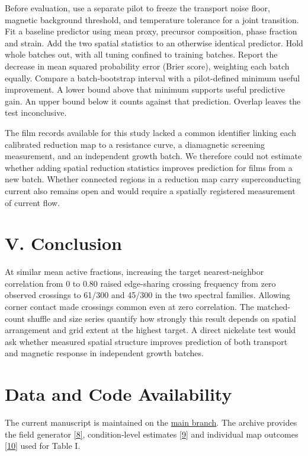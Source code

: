 \documentclass[11pt]{article}
\begin{document}
Before evaluation, use a separate pilot to freeze the transport noise floor, magnetic background threshold, and temperature tolerance for a joint transition. Fit a baseline predictor using mean proxy, precursor composition, phase fraction and strain. Add the two spatial statistics to an otherwise identical predictor. Hold whole batches out, with all tuning confined to training batches. Report the decrease in mean squared probability error (Brier score), weighting each batch equally. Compare a batch-bootstrap interval with a pilot-defined minimum useful improvement. A lower bound above that minimum supports useful predictive gain. An upper bound below it counts against that prediction. Overlap leaves the test inconclusive.

The film records available for this study lacked a common identifier linking each calibrated reduction map to a resistance curve, a diamagnetic screening measurement, and an independent growth batch. We therefore could not estimate whether adding spatial reduction statistics improves prediction for films from a new batch. Whether connected regions in a reduction map carry superconducting current also remains open and would require a spatially registered measurement of current flow.

\section*{V. Conclusion}

At similar mean active fractions, increasing the target nearest-neighbor correlation from 0 to 0.80 raised edge-sharing crossing frequency from zero observed crossings to 61/300 and 45/300 in the two spectral families. Allowing corner contact made crossings common even at zero correlation. The matched-count shuffle and size series quantify how strongly this result depends on spatial arrangement and grid extent at the highest target. A direct nickelate test would ask whether measured spatial structure improves prediction of both transport and magnetic response in independent growth batches.

\section*{Data and Code Availability}

The current manuscript is maintained on the \href{https://github.com/tejasvswipe/superconductvity-nickelate-research/blob/main/revised_manuscript.md}{main branch}. The archive provides the field generator \href{https://github.com/tejasvswipe/superconductvity-nickelate-research/blob/267535fd908d3e235b5c46d0fefe744221cf16e7/spatial_covariance_sensitivity.py}{[8]}, condition-level estimates \href{https://github.com/tejasvswipe/superconductvity-nickelate-research/blob/267535fd908d3e235b5c46d0fefe744221cf16e7/spatial_covariance_sensitivity.csv}{[9]} and individual map outcomes \href{https://github.com/tejasvswipe/superconductvity-nickelate-research/blob/267535fd908d3e235b5c46d0fefe744221cf16e7/spatial_covariance_sensitivity_replicates.csv}{[10]} used for Table I.
\end{document}
